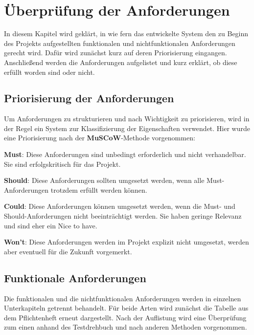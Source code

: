 \documentclass[../review_3.tex]{subfiles}
\begin{document}
\chapter{Überprüfung der Anforderungen}\thispagestyle{fancy}

In diesem Kapitel wird geklärt, in wie fern das entwickelte System den zu Beginn des Projekts aufgestellten funktionalen und nichtfunktionalen Anforderungen gerecht wird. Dafür wird zunächst kurz auf deren Priorisierung eingangen. Anschließend werden die Anforderungen aufgelistet und kurz erklärt, ob diese erfüllt worden sind oder nicht.
\vspace{-0.2cm}
\section{Priorisierung der Anforderungen}\thispagestyle{fancy}
Um Anforderungen zu strukturieren und nach Wichtigkeit zu priorisieren, wird in der Regel ein System zur Klassifizierung der Eigenschaften verwendet. Hier wurde eine Priorisierung nach der \textbf{MuSCoW}-Methode vorgenommen:
\begin{description}
    \item{\textbf{Must}:} Diese Anforderungen sind unbedingt erforderlich und nicht verhandelbar. Sie sind erfolgskritisch für das Projekt.
    \item{\textbf{Should}:} Diese Anforderungen sollten umgesetzt werden, wenn alle Must-Anforderungen trotzdem erfüllt werden können.
    \item{\textbf{Could}:} Diese Anforderungen können umgesetzt werden, wenn die Must- und Should-Anforderungen nicht beeinträchtigt werden. Sie haben geringe Relevanz und sind eher ein \glqq Nice to have\grqq.
    \item{\textbf{Won't}:} Diese Anforderungen werden im Projekt explizit nicht umgesetzt, werden aber eventuell für die Zukunft vorgemerkt.
\end{description}

\vspace{-0.2cm}

\section{Funktionale Anforderungen}

Die funktionalen und die nichtfunktionalen Anforderungen werden in einzelnen Unterkapiteln getrennt behandelt. Für beide Arten wird zunächst die Tabelle aus dem Pflichtenheft erneut dargestellt. Nach der Auflistung wird eine Überprüfung zum einen anhand des Testdrehbuch und nach anderen Methoden vorgenommen.
\end{document}
